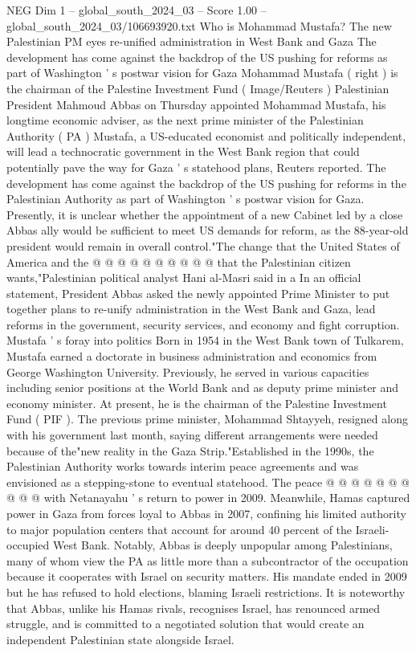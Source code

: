 \begin{textsample}{NEG Dim 1 – global\_south\_2024\_03 – Score 1.00 – global\_south\_2024\_03/106693920.txt}  \label{ex:f1_neg_434}
Who is Mohammad Mustafa?
The new Palestinian PM eyes re-unified administration in West Bank and Gaza The development has come against the backdrop of the US pushing for reforms as part of Washington ' s postwar vision for Gaza Mohammad Mustafa ( right ) is the chairman of the Palestine Investment Fund ( Image/Reuters ) Palestinian President Mahmoud Abbas on Thursday appointed Mohammad Mustafa, his longtime economic adviser, as the next prime minister of the Palestinian Authority ( PA ) Mustafa, a US-educated economist and politically independent, will lead a technocratic government in the West Bank region that could potentially pave the way for Gaza ' s statehood plans, Reuters reported.
The development has come against the backdrop of the US pushing for reforms in the Palestinian Authority as part of Washington ' s postwar vision for Gaza.
Presently, it is unclear whether the appointment of a new Cabinet led by a close Abbas ally would be sufficient to meet US demands for reform, as the 88-year-old president would remain in overall control."The change that the United States of America and the @ @ @ @ @ @ @ @ @ @ that the Palestinian citizen wants,"Palestinian political analyst Hani al-Masri said in a In an official statement, President Abbas asked the newly appointed Prime Minister to put together plans to re-unify administration in the West Bank and Gaza, lead reforms in the government, security services, and economy and fight corruption.
Mustafa ' s foray into politics Born in 1954 in the West Bank town of Tulkarem, Mustafa earned a doctorate in business administration and economics from George Washington University.
Previously, he served in various capacities including senior positions at the World Bank and as deputy prime minister and economy minister.
At present, he is the chairman of the Palestine Investment Fund ( PIF ).
The previous prime minister, Mohammad Shtayyeh, resigned along with his government last month, saying different arrangements were needed because of the"new reality in the Gaza Strip."Established in the 1990s, the Palestinian Authority works towards interim peace agreements and was envisioned as a stepping-stone to eventual statehood.
The peace @ @ @ @ @ @ @ @ @ @ with Netanayahu ' s return to power in 2009.
Meanwhile, Hamas captured power in Gaza from forces loyal to Abbas in 2007, confining his limited authority to major population centers that account for around 40 percent of the Israeli-occupied West Bank.
Notably, Abbas is deeply unpopular among Palestinians, many of whom view the PA as little more than a subcontractor of the occupation because it cooperates with Israel on security matters.
His mandate ended in 2009 but he has refused to hold elections, blaming Israeli restrictions.
It is noteworthy that Abbas, unlike his Hamas rivals, recognises Israel, has renounced armed struggle, and is committed to a negotiated solution that would create an independent Palestinian state alongside Israel.

\end{textsample}
